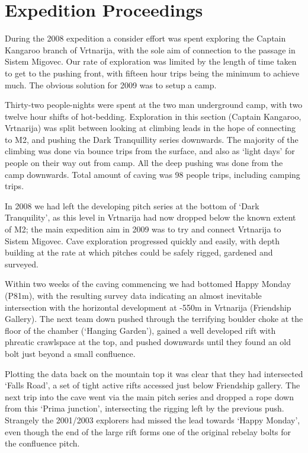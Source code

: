 \hypertarget{expedition-proceedings}{%
\section{Expedition Proceedings}\label{expedition-proceedings}}

During the 2008 expedition a consider effort was spent exploring the
Captain Kangaroo branch of Vrtnarija, with the sole aim of connection to
the passage in Sistem Migovec. Our rate of exploration was limited by
the length of time taken to get to the pushing front, with fifteen hour
trips being the minimum to achieve much. The obvious solution for 2009
was to setup a camp.

Thirty-two people-nights were spent at the two man underground camp,
with two twelve hour shifts of hot-bedding. Exploration in this section
(Captain Kangaroo, Vrtnarija) was split between looking at climbing
leads in the hope of connecting to M2, and pushing the Dark Tranquillity
series downwards. The majority of the climbing was done via bounce trips
from the surface, and also as `light days' for people on their way out
from camp. All the deep pushing was done from the camp downwards. Total
amount of caving was 98 people trips, including camping trips.

In 2008 we had left the developing pitch series at the bottom of `Dark
Tranquility', as this level in Vrtnarija had now dropped below the known
extent of M2; the main expedition aim in 2009 was to try and connect
Vrtnarija to Sistem Migovec. Cave exploration progressed quickly and
easily, with depth building at the rate at which pitches could be safely
rigged, gardened and surveyed.

Within two weeks of the caving commencing we had bottomed Happy Monday
(P81m), with the resulting survey data indicating an almost inevitable
intersection with the horizontal development at -550m in Vrtnarija
(Friendship Gallery). The next team down pushed through the terrifying
boulder choke at the floor of the chamber (`Hanging Garden'), gained a
well developed rift with phreatic crawlspace at the top, and pushed
downwards until they found an old bolt just beyond a small confluence.

Plotting the data back on the mountain top it was clear that they had
intersected `Falls Road', a set of tight active rifts accessed just
below Friendship gallery. The next trip into the cave went via the main
pitch series and dropped a rope down from this `Prima junction',
intersecting the rigging left by the previous push. Strangely the
2001/2003 explorers had missed the lead towards `Happy Monday', even
though the end of the large rift forms one of the original rebelay bolts
for the confluence pitch.

